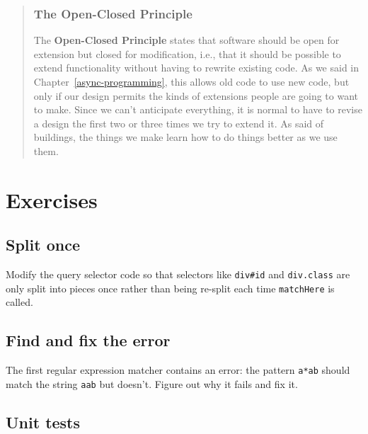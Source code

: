 \documentclass[krantzl]{krantz}
\newcommand{\chapref}[1]{Chapter~\ref{#1}}
\newcommand{\glossref}[1]{\textbf{#1}}
\newenvironment{callout}{\savenotes\begin{tBox}\begin{quotation}\toggletrue{inbox}\renewcommand{\thempfootnote}{\arabic{footnote}}}{\end{quotation}\vspace{\baselineskip}\end{tBox}\togglefalse{inbox}\spewnotes}
\begin{document}
\begin{callout}


\subsubsection*{The Open-Closed Principle}


The \glossref{Open-Closed Principle} states that
software should be open for extension but closed for modification,
i.e., that it should be possible to extend functionality
without having to rewrite existing code.
As we said in \chapref{async-programming},
this allows old code to use new code,
but only if our design permits the kinds of extensions people are going to want to make.
Since we can't anticipate everything,
it is normal to have to revise a design the first two or three times we try to extend it.
As \cite{Brand1995} said of buildings,
the things we make learn how to do things better as we use them.

\end{callout}


\section{Exercises}\label{pattern-matching-exercises}

\subsection*{Split once}


Modify the query selector code so that selectors like \texttt{div\#id} and \texttt{div.class} are only split into pieces once
rather than being re-split each time \texttt{matchHere} is called.

\subsection*{Find and fix the error}


The first regular expression matcher contains an error:
the pattern \texttt{{\textquotesingle}a*ab{\textquotesingle}} should match the string \texttt{{\textquotesingle}aab{\textquotesingle}} but doesn't.
Figure out why it fails and fix it.

\subsection*{Unit tests}
\end{document}
